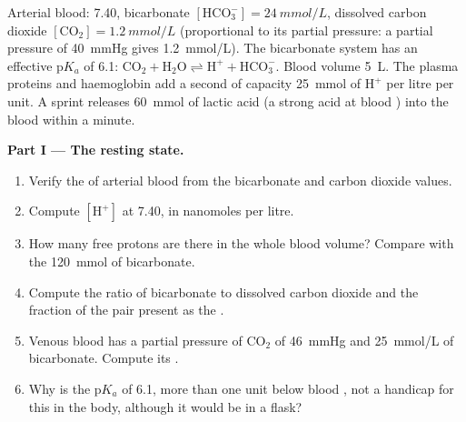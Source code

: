 \begin{problem}
\label{pb:b1:water-small-molecules:1}
Arterial blood:  7.40, bicarbonate $[\mathrm{HCO_3^-}] =
\qty{24}{mmol/L}$, dissolved carbon dioxide $[\mathrm{CO_2}] =
\qty{1.2}{mmol/L}$ (proportional to its partial pressure: a partial
pressure of \qty{40}{mmHg} gives \qty{1.2}{mmol/L}). The bicarbonate
system has an effective p$K_a$ of 6.1: $\mathrm{CO_2} + \mathrm{H_2O}
\rightleftharpoons \mathrm{H^+} + \mathrm{HCO_3^-}$. Blood volume
\qty{5}{L}. The plasma proteins and haemoglobin add a second  of
capacity \qty{25}{mmol} of $\mathrm{H^+}$ per litre per  unit. A
sprint releases \qty{60}{mmol} of lactic acid (a strong acid at blood
) into the blood within a minute.

\medskip
\noindent\textbf{Part I --- The resting state.}
\begin{enumerate}
  \item Verify the  of arterial blood from the bicarbonate and
        carbon dioxide values.
  \item Compute $[\mathrm{H^+}]$ at  7.40, in nanomoles per litre.
  \item How many free protons are there in the whole blood volume?
        Compare with the \qty{120}{mmol} of bicarbonate.
  \item Compute the ratio of bicarbonate to dissolved carbon dioxide
        and the fraction of the  pair present as the .
  \item Venous blood has a partial pressure of $\mathrm{CO_2}$ of
        \qty{46}{mmHg} and \qty{25}{mmol/L} of bicarbonate. Compute its
        .
  \item Why is the p$K_a$ of 6.1, more than one unit below blood ,
        not a handicap for this  in the body, although it would
        be in a flask?
\end{enumerate}


\end{problem}
